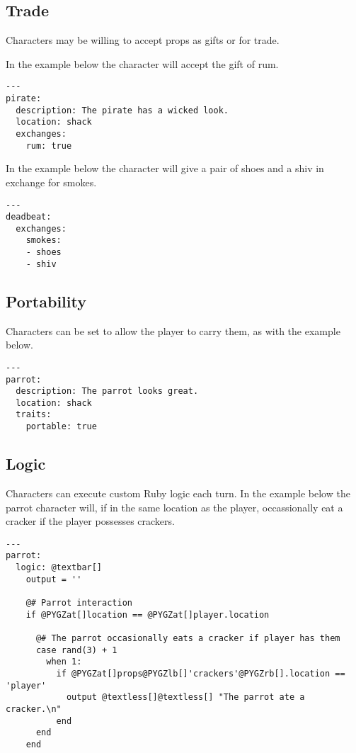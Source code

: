 \documentclass[letterpaper,10pt,english]{sphinxmanual}
\begin{document}
\subsection{Trade}
\label{elements:trade}
Characters may be willing to accept props as gifts or for trade.

In the example below the character will accept the gift of rum.

\begin{Verbatim}[commandchars=@\[\]]
---
pirate:
  description: The pirate has a wicked look.
  location: shack
  exchanges:
    rum: true
\end{Verbatim}

In the example below the character will give a pair of shoes and a shiv in exchange for smokes.

\begin{Verbatim}[commandchars=@\[\]]
---
deadbeat:
  exchanges:
    smokes:
    - shoes
    - shiv
\end{Verbatim}


\subsection{Portability}
\label{elements:id1}
Characters can be set to allow the player to carry them, as with the example below.

\begin{Verbatim}[commandchars=@\[\]]
---
parrot:
  description: The parrot looks great.
  location: shack
  traits:
    portable: true
\end{Verbatim}


\subsection{Logic}
\label{elements:logic}
Characters can execute custom Ruby logic each turn. In the example below the parrot character will, if in the same location as the player, occassionally eat a cracker if the player possesses crackers.

\begin{Verbatim}[commandchars=@\[\]]
---
parrot:
  logic: @textbar[]
    output = ''

    @# Parrot interaction
    if @PYGZat[]location == @PYGZat[]player.location

      @# The parrot occasionally eats a cracker if player has them
      case rand(3) + 1
        when 1:
          if @PYGZat[]props@PYGZlb[]'crackers'@PYGZrb[].location == 'player'
            output @textless[]@textless[] "The parrot ate a cracker.\n"
          end
      end
    end
\end{Verbatim}
\end{document}

